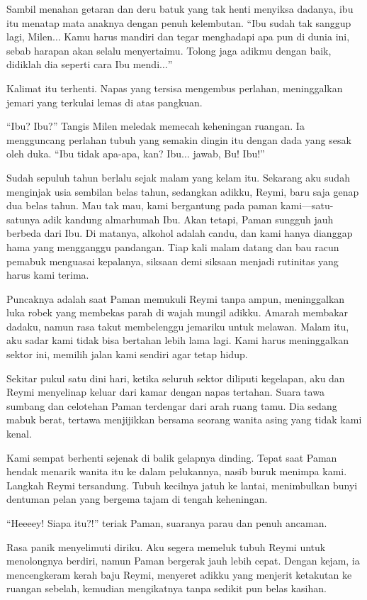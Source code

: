 Sambil menahan getaran dan deru batuk yang tak henti menyiksa dadanya, ibu itu menatap mata anaknya dengan penuh kelembutan. ``Ibu sudah tak sanggup lagi, Milen$\dots$ Kamu harus mandiri dan tegar menghadapi apa pun di dunia ini, sebab harapan akan selalu menyertaimu. Tolong jaga adikmu dengan baik, didiklah dia seperti cara Ibu mendi$\dots$''

Kalimat itu terhenti. Napas yang tersisa mengembus perlahan, meninggalkan jemari yang terkulai lemas di atas pangkuan.

``Ibu? Ibu?'' Tangis Milen meledak memecah keheningan ruangan. Ia mengguncang perlahan tubuh yang semakin dingin itu dengan dada yang sesak oleh duka. ``Ibu tidak apa-apa, kan? Ibu$\dots$ jawab, Bu! Ibu!''

Sudah sepuluh tahun berlalu sejak malam yang kelam itu. Sekarang aku sudah menginjak usia sembilan belas tahun, sedangkan adikku, Reymi, baru saja genap dua belas tahun. Mau tak mau, kami bergantung pada paman kami—satu-satunya adik kandung almarhumah Ibu. Akan tetapi, Paman sungguh jauh berbeda dari Ibu. Di matanya, alkohol adalah candu, dan kami hanya dianggap hama yang mengganggu pandangan. Tiap kali malam datang dan bau racun pemabuk menguasai kepalanya, siksaan demi siksaan menjadi rutinitas yang harus kami terima.

Puncaknya adalah saat Paman memukuli Reymi tanpa ampun, meninggalkan luka robek yang membekas parah di wajah mungil adikku. Amarah membakar dadaku, namun rasa takut membelenggu jemariku untuk melawan. Malam itu, aku sadar kami tidak bisa bertahan lebih lama lagi. Kami harus meninggalkan sektor ini, memilih jalan kami sendiri agar tetap hidup.

Sekitar pukul satu dini hari, ketika seluruh sektor diliputi kegelapan, aku dan Reymi menyelinap keluar dari kamar dengan napas tertahan. Suara tawa sumbang dan celotehan Paman terdengar dari arah ruang tamu. Dia sedang mabuk berat, tertawa menjijikkan bersama seorang wanita asing yang tidak kami kenal.

Kami sempat berhenti sejenak di balik gelapnya dinding. Tepat saat Paman hendak menarik wanita itu ke dalam pelukannya, nasib buruk menimpa kami. Langkah Reymi tersandung. Tubuh kecilnya jatuh ke lantai, menimbulkan bunyi dentuman pelan yang bergema tajam di tengah keheningan.

``Heeeey! Siapa itu?!'' teriak Paman, suaranya parau dan penuh ancaman.

Rasa panik menyelimuti diriku. Aku segera memeluk tubuh Reymi untuk menolongnya berdiri, namun Paman bergerak jauh lebih cepat. Dengan kejam, ia mencengkeram kerah baju Reymi, menyeret adikku yang menjerit ketakutan ke ruangan sebelah, kemudian mengikatnya tanpa sedikit pun belas kasihan.

